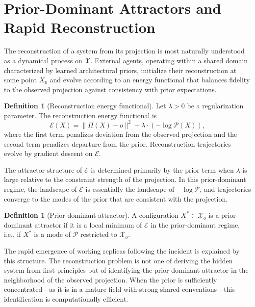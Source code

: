 \documentclass[12pt, oneside]{article}
\theoremstyle{plain}
\theoremstyle{definition}
\newtheorem{definition}[theorem]{Definition}
\theoremstyle{remark}
\newcommand{\proj}{\Pi}
\newcommand{\energy}{\mathcal{E}}
\newcommand{\config}{\mathcal{X}}
\newcommand{\prior}{\mathcal{P}}
\begin{document}
\section{Prior-Dominant Attractors and Rapid Reconstruction}

The reconstruction of a system from its projection is most naturally understood as a
dynamical process on $\config$. External agents, operating within a shared domain
characterized by learned architectural priors, initialize their reconstruction at some
point $X_0$ and evolve according to an energy functional that balances fidelity to the
observed projection against consistency with prior expectations.

\begin{definition}[Reconstruction energy functional]
Let $\lambda > 0$ be a regularization parameter. The reconstruction energy functional is
\[
  \energy(X) = \| \proj(X) - o \|^2 + \lambda \cdot (-\log \prior(X)),
\]
where the first term penalizes deviation from the observed projection and the second term
penalizes departure from the prior. Reconstruction trajectories evolve by gradient descent
on $\energy$.
\end{definition}

The attractor structure of $\energy$ is determined primarily by the prior term when $\lambda$
is large relative to the constraint strength of the projection. In this prior-dominant
regime, the landscape of $\energy$ is essentially the landscape of $-\log \prior$, and
trajectories converge to the modes of the prior that are consistent with the projection.

\begin{definition}[Prior-dominant attractor]
A configuration $X^* \in \config_o$ is a prior-dominant attractor if it is a local minimum
of $\energy$ in the prior-dominant regime, i.e., if $X^*$ is a mode of $\prior$ restricted
to $\config_o$.
\end{definition}

The rapid emergence of working replicas following the incident is explained by this
structure. The reconstruction problem is not one of deriving the hidden system from first
principles but of identifying the prior-dominant attractor in the neighborhood of the
observed projection. When the prior is sufficiently concentrated---as it is in a mature
field with strong shared conventions---this identification is computationally efficient.
\end{document}
